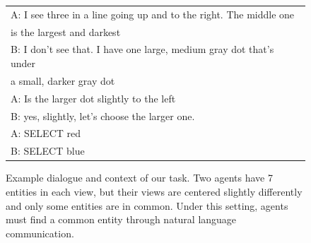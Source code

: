 \documentclass[letterpaper]{article} %
\begin{document}
\begin{figure}[ht]
\small
\begin{tabular}{@{}l@{}}
\toprule
A: I see three in a line going up and to the right. The middle one \\
is the largest and darkest \\
B: I don't see that. I have one large, medium gray dot that's under \\
a small, darker gray dot \\
A: Is the larger dot slightly to the left \\
B: yes, slightly, let's choose the larger one. \\
A: SELECT {\color{red} red} \\
B: SELECT {\color{blue} blue} \\
\bottomrule
\end{tabular}
\caption{Example dialogue and context of our task. Two agents have 7 entities in each view, but their views are centered slightly differently and only some entities are in common. Under this setting, agents must find a common entity through natural language communication.
}
\label{fig:example}
\end{figure}
\end{document}
